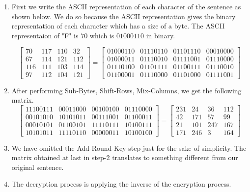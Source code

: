 \begin{enumerate}
\item First we write the ASCII representation of each character of the sentence as shown below. We do so because the ASCII representation gives the binary representation of each character which has a size of a byte. The ASCII representaion of "F" is \(70\) which is \(01000110\) in binary.
  \vspace{2mm}

    \[\begin{bmatrix}
        70 & 117 & 110 & 32 \\
        67 & 114 & 121 & 112\\
        116 & 111 & 103 & 114 \\
        97 & 112 & 104 & 121
    \end{bmatrix}=
    \begin{bmatrix}
        01000110 & 01110110 & 01101110 & 00010000 \\
        01000011 & 01110010 & 01111001 & 01110000\\
        01110100 & 01101111 & 01100111 & 01110010 \\
        01100001 & 01110000 & 01101000 & 01111001
    \end{bmatrix}
    \]

    \item After performing Sub-Bytes, Shift-Rows, Mix-Columns, we get the following matrix. \vspace{3mm}
    \[\begin{bmatrix}
       11100111 & 00011000 & 00100100 & 01110000\\
       00101010 & 10101011 & 00111001 & 01100011\\
       00010101 & 01100101 & 11110111 & 10100111\\
       10101011 & 11110110 & 00000011 & 10100100
    \end{bmatrix}=
    \begin{bmatrix}
        231 & 24 & 36 & 112\\
        42 & 171 & 57 & 99\\
        21 & 101 & 247 & 167\\
        171 & 246 & 3 & 164
    \end{bmatrix}
  \]
  \vspace{3mm}

    \item We have omitted the Add-Round-Key step just for the sake of simplicity. The matrix obtained at last in step-2 translates to something different from our original sentence.

    \item The decryption process is applying the inverse of the encryption process.
\end{enumerate}
